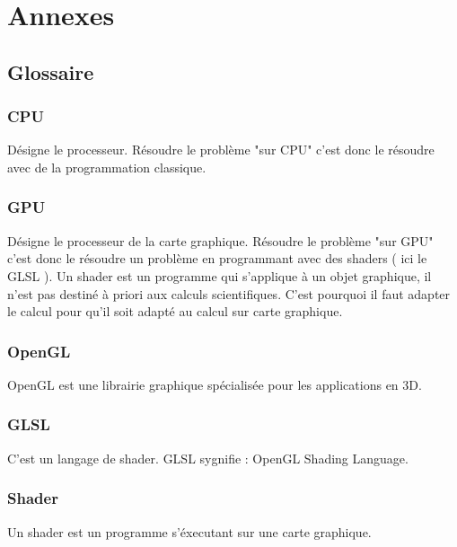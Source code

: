 \documentclass[a4paper,10pt]{article}
\begin{document}
\section{Annexes}

\subsection{Glossaire}

\subsubsection{CPU}
Désigne le processeur. Résoudre le problème "sur CPU" c'est donc le résoudre avec
de la programmation classique.
\subsubsection{GPU}
Désigne le processeur de la carte graphique. Résoudre le problème "sur GPU" c'est donc le résoudre 
un problème en programmant avec des shaders ( ici le GLSL ). Un shader est un programme qui s'applique à 
un objet graphique, il n'est pas destiné à priori aux calculs scientifiques. C'est pourquoi
il faut adapter le calcul pour qu'il soit adapté au calcul sur carte graphique.
\subsubsection{OpenGL}
OpenGL est une librairie graphique spécialisée pour les applications en 3D.
\subsubsection{GLSL}
C'est un langage de shader. GLSL sygnifie : OpenGL Shading Language.
\subsubsection{Shader}
Un shader est un programme s'éxecutant sur une carte graphique.

\end{document}
